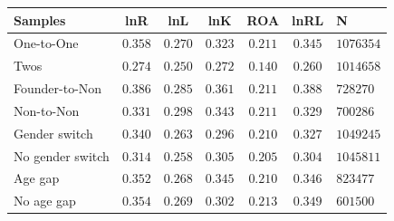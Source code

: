 \begin{tabular}{l*{5}{c}}
\hline\hline
Samples & lnR & lnL & lnK & ROA & lnRL & N \\
\hline
One-to-One & $0.358$ & $0.270$ & $0.323$ & $0.211$ & $0.345$ & $1076354$ \\
Twos & $0.274$ & $0.250$ & $0.272$ & $0.140$ & $0.260$ & $1014658$ \\
Founder-to-Non & $0.386$ & $0.285$ & $0.361$ & $0.211$ & $0.388$ & $728270$ \\
Non-to-Non & $0.331$ & $0.298$ & $0.343$ & $0.211$ & $0.329$ & $700286$ \\
Gender switch & $0.340$ & $0.263$ & $0.296$ & $0.210$ & $0.327$ & $1049245$ \\
No gender switch & $0.314$ & $0.258$ & $0.305$ & $0.205$ & $0.304$ & $1045811$ \\
Age gap & $0.352$ & $0.268$ & $0.345$ & $0.210$ & $0.346$ & $823477$ \\
No age gap & $0.354$ & $0.269$ & $0.302$ & $0.213$ & $0.349$ & $601500$ \\
\hline\hline
\end{tabular}
